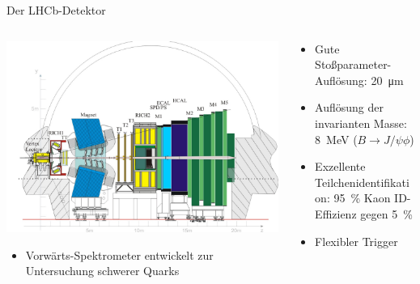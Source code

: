 \documentclass[compress,aspectratio=43]{beamer}
\begin{document}
\begin{frame}[shrink=10]{Der LHCb-Detektor}
  \begin{columns}
    \begin{column}{0.7\textwidth}
      \vspace{1em}
      \includegraphics[width=\textwidth,trim=3em 0 0 0,clip]{lhcb.pdf}
      \begin{itemize}
        \item Vorwärts-Spektrometer entwickelt zur Untersuchung schwerer Quarks
      \end{itemize}
    \end{column}
  \begin{column}{0.35\textwidth}
    \begin{itemize}
      \item Gute Stoßparameter-Auflösung: \SI{20}{\micro\metre}
      \item Auflösung der invarianten Masse: \SI{8}{MeV} ($B\to J\!/\!\psi \phi$)
      \item Exzellente Teilchenidentifikation: \SI{95}{\percent} Kaon ID-Effizienz gegen \SI{5}{\percent}
      \item Flexibler Trigger
    \end{itemize}
  \end{column}
  \end{columns}
\end{frame}
\end{document}
